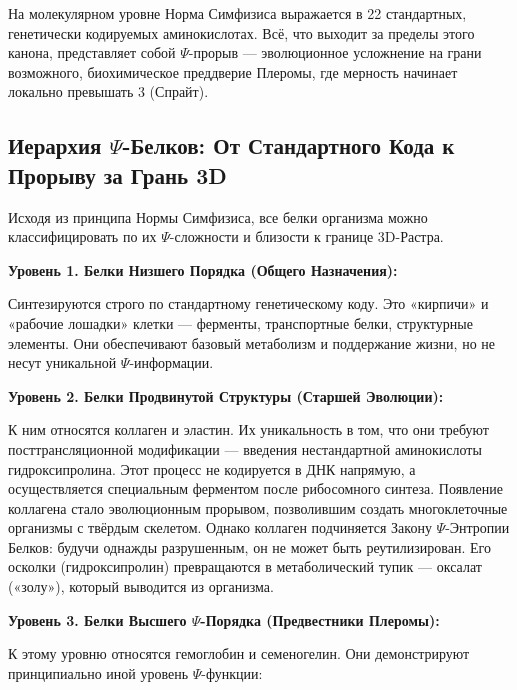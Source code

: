 \documentclass[a4paper,12pt]{article}
\begin{document}
На молекулярном уровне Норма Симфизиса выражается в 22 стандартных, генетически кодируемых аминокислотах. Всё, что выходит за пределы этого канона, представляет собой $\Psi$-прорыв — эволюционное усложнение на грани возможного, биохимическое преддверие Плеромы, где мерность начинает локально превышать 3 (Спрайт).

\subsection{Иерархия $\Psi$-Белков: От Стандартного Кода к Прорыву за Грань 3D}

Исходя из принципа Нормы Симфизиса, все белки организма можно классифицировать по их $\Psi$-сложности и близости к границе 3D-Растра.

\textbf{Уровень 1. Белки Низшего Порядка (Общего Назначения):}

Синтезируются строго по стандартному генетическому коду. Это «кирпичи» и «рабочие лошадки» клетки — ферменты, транспортные белки, структурные элементы. Они обеспечивают базовый метаболизм и поддержание жизни, но не несут уникальной $\Psi$-информации.

\textbf{Уровень 2. Белки Продвинутой Структуры (Старшей Эволюции):}

К ним относятся коллаген и эластин. Их уникальность в том, что они требуют посттрансляционной модификации — введения нестандартной аминокислоты гидроксипролина. Этот процесс не кодируется в ДНК напрямую, а осуществляется специальным ферментом после рибосомного синтеза. Появление коллагена стало эволюционным прорывом, позволившим создать многоклеточные организмы с твёрдым скелетом. Однако коллаген подчиняется Закону $\Psi$-Энтропии Белков: будучи однажды разрушенным, он не может быть реутилизирован. Его осколки (гидроксипролин) превращаются в метаболический тупик — оксалат («золу»), который выводится из организма.

\textbf{Уровень 3. Белки Высшего $\Psi$-Порядка (Предвестники Плеромы):}

К этому уровню относятся гемоглобин и семеногелин. Они демонстрируют принципиально иной уровень $\Psi$-функции:
\end{document}

